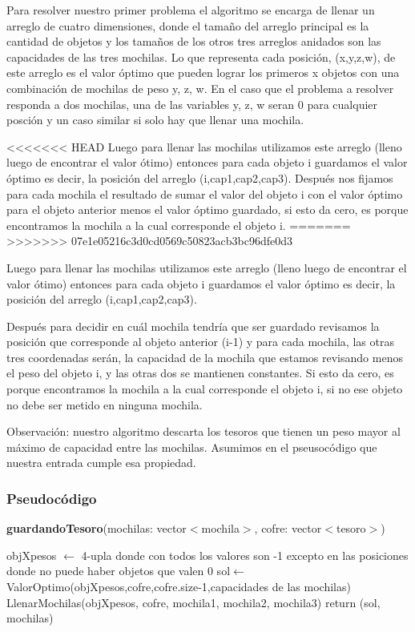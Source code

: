 \documentclass[spanish,12pt]{article}
\begin{document}
{	Para resolver nuestro primer problema el algoritmo se encarga de llenar un arreglo de cuatro dimensiones, donde el tamaño del arreglo principal es la cantidad de objetos y los tamaños de los otros tres arreglos anidados son las capacidades de las tres mochilas.
	Lo que representa cada posición, (x,y,z,w), de este arreglo es el valor óptimo que pueden lograr los primeros x objetos con una combinación de mochilas de peso y, z, w. En el caso que el problema a resolver responda a dos mochilas, una de las variables y, z, w seran 0 para cualquier posción y un caso similar si solo hay que llenar una mochila.

<<<<<<< HEAD
	Luego para llenar las mochilas utilizamos este arreglo (lleno luego de encontrar el valor ótimo) entonces para cada objeto i guardamos el valor óptimo es decir, la posición del arreglo (i,cap1,cap2,cap3). Después nos fijamos para cada mochila  el resultado de sumar el valor del objeto i con el valor óptimo para el objeto anterior menos el valor óptimo guardado, si esto da cero, es porque encontramos la mochila a la cual corresponde el objeto i.
=======
>>>>>>> 07e1e05216c3d0cd0569c50823acb3bc96dfe0d3

	Luego para llenar las mochilas utilizamos este arreglo (lleno luego de encontrar el valor ótimo) entonces para cada objeto i guardamos el valor óptimo es decir, la posición del arreglo (i,cap1,cap2,cap3). 

	Después para decidir en cuál mochila tendría que ser guardado revisamos la posición que corresponde al objeto anterior (i-1) y para cada mochila, las otras tres coordenadas serán, la capacidad de la mochila que estamos revisando menos el peso del objeto i, y las otras dos se mantienen constantes. Si esto da cero, es porque encontramos la mochila a la cual corresponde el objeto i, si no ese objeto no debe ser metido en ninguna mochila. 


	Observación: nuestro algoritmo descarta los tesoros que tienen un peso mayor al máximo de capacidad entre las mochilas. Asumimos en el pseusocódigo que nuestra entrada cumple esa propiedad.


\subsubsection{Pseudocódigo}

\begin{algorithm}[H]{\textbf{guardandoTesoro}(mochilas: vector$<$mochila$>$, cofre: vector$<$tesoro$>$)}
	\begin{algorithmic}[1]
		\State objXpesos $\gets$ 4-upla donde con todos los valores son -1 excepto en las posiciones donde no puede haber objetos que valen  0 %
		\State sol$\gets$ ValorOptimo(objXpesos,cofre,cofre.size-1,capacidades de las mochilas)
		\State LlenarMochilas(objXpesos, cofre, mochila1, mochila2, mochila3)
		\State return (sol, mochilas)
	\end{algorithmic}
\end{algorithm}



}
\end{document}
